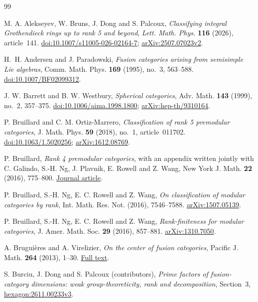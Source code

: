\documentclass[11pt,a4paper]{article}
\numberwithin{equation}{section}
\begin{document}
\begin{thebibliography}{99}
\raggedright

 M. A. Alekseyev, W. Bruns, J. Dong and S. Palcoux,
\emph{Classifying integral Grothendieck rings up to rank 5 and beyond},
\emph{Lett. Math. Phys.} \textbf{116} (2026), article~141.
\href{https://doi.org/10.1007/s11005-026-02164-7}{doi:10.1007/s11005-026-02164-7};
\href{https://arxiv.org/abs/2507.07023v2}{arXiv:2507.07023v2}.

H.~H. Andersen and J. Paradowski,
\emph{Fusion categories arising from semisimple Lie algebras},
Comm. Math. Phys. \textbf{169} (1995), no.~3, 563--588.
\href{https://doi.org/10.1007/BF02099312}{doi:10.1007/BF02099312}.

 J. W. Barrett and B. W. Westbury,
\emph{Spherical categories}, Adv. Math. \textbf{143}
(1999), no.~2, 357--375.
\href{https://doi.org/10.1006/aima.1998.1800}{doi:10.1006/aima.1998.1800};
\href{https://arxiv.org/abs/hep-th/9310164}{arXiv:hep-th/9310164}.

 P. Bruillard and C. M. Ortiz-Marrero,
\emph{Classification of rank 5 premodular categories},
J. Math. Phys. \textbf{59} (2018), no.~1, article~011702.
\href{https://doi.org/10.1063/1.5020256}{doi:10.1063/1.5020256};
\href{https://arxiv.org/abs/1612.08769}{arXiv:1612.08769}.

 P. Bruillard,
\emph{Rank 4 premodular categories}, with an appendix written jointly with
C. Galindo, S.-H. Ng, J. Plavnik, E. Rowell and Z. Wang,
New York J. Math. \textbf{22} (2016), 775--800.
\href{https://nyjm.albany.edu/j/2016/22-36.html}{Journal article}.

 P. Bruillard, S.-H. Ng, E. C. Rowell and Z. Wang,
\emph{On classification of modular categories by rank}, Int. Math. Res. Not. (2016), 7546--7588.
\href{https://arxiv.org/abs/1507.05139}{arXiv:1507.05139}.

 P. Bruillard, S.-H. Ng, E. C. Rowell and Z. Wang, \emph{Rank-finiteness for modular categories}, J. Amer. Math. Soc. \textbf{29} (2016), 857--881. \href{https://arxiv.org/abs/1310.7050}{arXiv:1310.7050}.

 A. Bruguières and A. Virelizier,
\emph{On the center of fusion categories}, Pacific J. Math.
\textbf{264} (2013), 1--30. \href{https://www.math.virelizier.com/sources/articles/Center-fusion.pdf}{Full text}.

 S. Burciu, J. Dong and S. Palcoux (contributors), \emph{Prime factors of fusion-category dimensions: weak group-theoreticity, rank and decomposition}, Section~3, \href{https://hexagonmath.org/2611.00233v3}{hexagon:2611.00233v3}.


\end{thebibliography}
\end{document}
